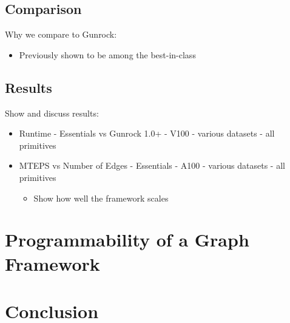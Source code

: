 \documentclass[11pt,a4paper]{article}
\begin{document}
\subsection{Comparison}
Why we compare to Gunrock:
\begin{itemize}
    \item Previously shown to be among the best-in-class \cite{Wang:2017:GGG}
\end{itemize}
\subsection{Results}
Show and discuss results:
\begin{itemize}
    \item Runtime - Essentials vs Gunrock 1.0+ - V100 - various datasets - all primitives
    \item MTEPS vs Number of Edges - Essentials - A100 - various datasets - all primitives
    \begin{itemize}
        \item Show how well the framework scales
    \end{itemize}
\end{itemize}
\section{Programmability of a Graph Framework}
\section{Conclusion}
\printbibliography
\end{document}
